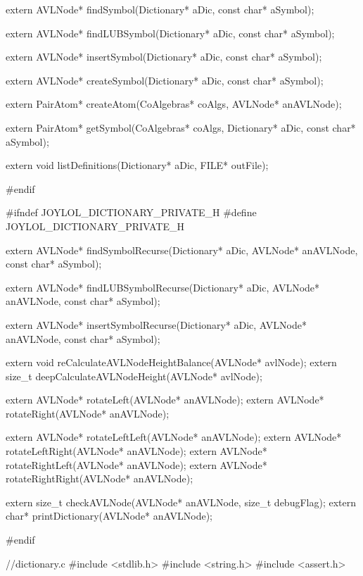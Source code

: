 \starttyping

extern AVLNode* findSymbol(Dictionary* aDic, const char* aSymbol);

extern AVLNode* findLUBSymbol(Dictionary* aDic, const char* aSymbol);

extern AVLNode* insertSymbol(Dictionary* aDic, const char* aSymbol);

extern AVLNode* createSymbol(Dictionary* aDic, const char* aSymbol);

extern PairAtom* createAtom(CoAlgebras* coAlgs, AVLNode* anAVLNode);

extern PairAtom* getSymbol(CoAlgebras* coAlgs,
                           Dictionary* aDic,
                           const char* aSymbol);

extern void listDefinitions(Dictionary* aDic, FILE* outFile);

#endif
\stoptyping

\starttyping
#ifndef JOYLOL_DICTIONARY_PRIVATE_H
#define JOYLOL_DICTIONARY_PRIVATE_H

extern AVLNode* findSymbolRecurse(Dictionary* aDic,
                                  AVLNode* anAVLNode,
                                  const char* aSymbol);

extern AVLNode* findLUBSymbolRecurse(Dictionary* aDic,
                                     AVLNode* anAVLNode,
                                     const char* aSymbol);

extern AVLNode* insertSymbolRecurse(Dictionary* aDic,
                                    AVLNode* anAVLNode,
                                    const char* aSymbol);


extern void reCalculateAVLNodeHeightBalance(AVLNode* avlNode);
extern size_t deepCalculateAVLNodeHeight(AVLNode* avlNode);

extern AVLNode* rotateLeft(AVLNode* anAVLNode);
extern AVLNode* rotateRight(AVLNode* anAVLNode);

extern AVLNode* rotateLeftLeft(AVLNode* anAVLNode);
extern AVLNode* rotateLeftRight(AVLNode* anAVLNode);
extern AVLNode* rotateRightLeft(AVLNode* anAVLNode);
extern AVLNode* rotateRightRight(AVLNode* anAVLNode);

extern size_t checkAVLNode(AVLNode* anAVLNode, size_t debugFlag);
extern char* printDictionary(AVLNode* anAVLNode);

#endif
\stoptyping

\starttyping
//dictionary.c
#include <stdlib.h>
#include <string.h>
#include <assert.h>


